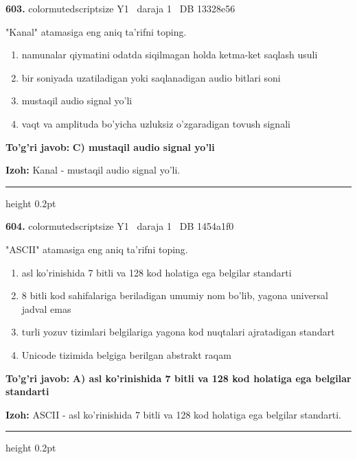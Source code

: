 \documentclass[10pt,a4paper,oneside]{article}
\begin{document}
\noindent\textbf{\color{ink}603.}  {color{muted}scriptsize Y1 \textbullet\ daraja 1 \textbullet\ DB 13328e56}
\par
"Kanal" atamasiga eng aniq ta'rifni toping.
\begin{enumerate}[label=\Alph*),leftmargin=9mm]
\item namunalar qiymatini odatda siqilmagan holda ketma-ket saqlash usuli
\item bir soniyada uzatiladigan yoki saqlanadigan audio bitlari soni
\item mustaqil audio signal yo'li
\item vaqt va amplituda bo'yicha uzluksiz o'zgaradigan tovush signali
\end{enumerate}
\begin{tcolorbox}[enhanced,breakable,colback=teal!4,colframe=teal!50!black,boxrule=0.5pt,arc=1.1mm,left=3mm,right=3mm,top=1.7mm,bottom=1.7mm,before skip=2mm,after skip=2mm]
\textbf{\color{teal}To'g'ri javob:} \textbf{C) mustaqil audio signal yo'li}
\par\smallskip
\textbf{Izoh:} Kanal - mustaqil audio signal yo'li.
\end{tcolorbox}
\vspace{2mm}\hrule height 0.2pt \vspace{3mm}

\noindent\textbf{\color{ink}604.}  {color{muted}scriptsize Y1 \textbullet\ daraja 1 \textbullet\ DB 1454a1f0}
\par
"ASCII" atamasiga eng aniq ta'rifni toping.
\begin{enumerate}[label=\Alph*),leftmargin=9mm]
\item asl ko'rinishida 7 bitli va 128 kod holatiga ega belgilar standarti
\item 8 bitli kod sahifalariga beriladigan umumiy nom bo'lib, yagona universal jadval emas
\item turli yozuv tizimlari belgilariga yagona kod nuqtalari ajratadigan standart
\item Unicode tizimida belgiga berilgan abstrakt raqam
\end{enumerate}
\begin{tcolorbox}[enhanced,breakable,colback=teal!4,colframe=teal!50!black,boxrule=0.5pt,arc=1.1mm,left=3mm,right=3mm,top=1.7mm,bottom=1.7mm,before skip=2mm,after skip=2mm]
\textbf{\color{teal}To'g'ri javob:} \textbf{A) asl ko'rinishida 7 bitli va 128 kod holatiga ega belgilar standarti}
\par\smallskip
\textbf{Izoh:} ASCII - asl ko'rinishida 7 bitli va 128 kod holatiga ega belgilar standarti.
\end{tcolorbox}
\vspace{2mm}\hrule height 0.2pt \vspace{3mm}
\end{document}
